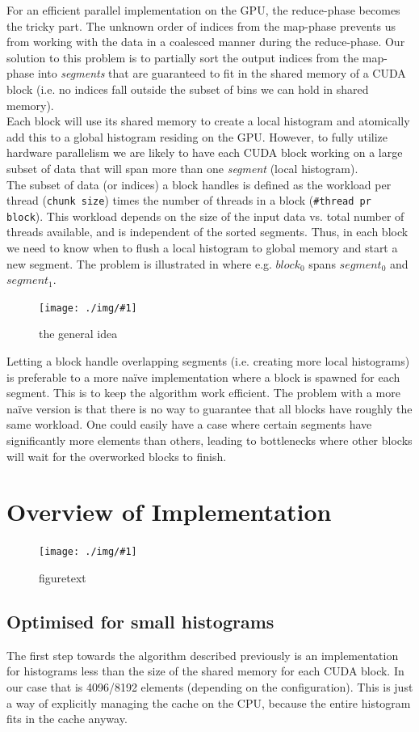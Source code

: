 \documentclass[12pt, a4paper, hidelinks]{article}
\newcommand{\fig}[3]{
\begin{figure}[h]
  \begin{center}
    \texttt{[image: ./img/\#1]}
  \end{center}
  \caption{#3}
  \label{fig:#1}
\end{figure}
}
\renewcommand{\tt}[1]{\texttt{#1}}
\renewcommand{\it}[1]{\textit{#1}}
\begin{document}
For an efficient parallel implementation on the GPU,
the reduce-phase becomes the tricky part.
The unknown order of indices from the map-phase
prevents us from working with the data in a coalesced manner during the reduce-phase.
Our solution to this problem is to partially sort the output indices from
the map-phase into \it{segments} that are guaranteed to fit in the
shared memory of a CUDA block (i.e. no indices fall outside the subset of bins
we can hold in shared memory).\\
Each block will use its shared memory to create a local histogram
and atomically add this to a global histogram residing on the GPU.
However, to fully utilize hardware parallelism we are likely to have
each CUDA block working on a large subset of data that will
span more than one \it{segment} (local histogram).\\
The subset of data (or indices) a block handles is defined as the workload per thread
(\tt{chunk size}) times the number of threads in a block (\tt{\#thread pr block}).
This workload depends on the size of the input data vs.
total number of threads available, and is independent of the sorted segments.
Thus, in each block we need to know when to flush a local histogram to global
memory and start a new segment.
The problem is illustrated in  where e.g.
$block_0$ spans $segment_0$ and $segment_1$.

\fig{overview}{140}{the general idea}

Letting a block handle overlapping segments (i.e. creating more local histograms)
is preferable to a more naïve implementation where a block is spawned
for each segment. This is to keep the algorithm work efficient.
The problem with a more naïve version is that there is no way
to guarantee that all blocks have roughly the same workload.
One could easily have a case where certain segments have significantly
more elements than others, leading to bottlenecks where other blocks will
wait for the overworked blocks to finish.

\section{Overview of Implementation}
\fig{device-dia}{140}{figuretext}

\subsection{Optimised for small histograms}
The first step towards the algorithm described previously is an implementation
for histograms less than the size of the shared memory for each CUDA block.
In our case that is 4096/8192 elements (depending on the configuration).
This is just a way of explicitly managing the cache on the CPU, because the
entire histogram fits in the cache anyway.
\end{document}
